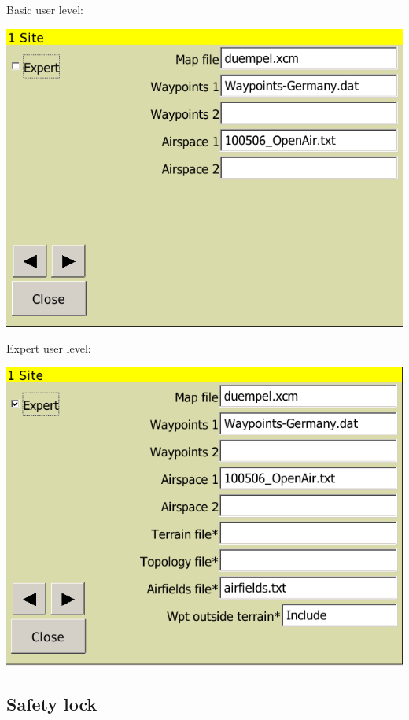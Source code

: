 \documentclass[a4paper,12pt]{refrep}
\begin{document}
Basic user level:
\begin{center}
\includegraphics[angle=0,width=\linewidth,keepaspectratio='true']{figures/config-basic.png}
\end{center}

Expert user level:
\begin{center}
\includegraphics[angle=0,width=\linewidth,keepaspectratio='true']{figures/config-expert.png}
\end{center}

\subsection*{Safety lock}
\end{document}
